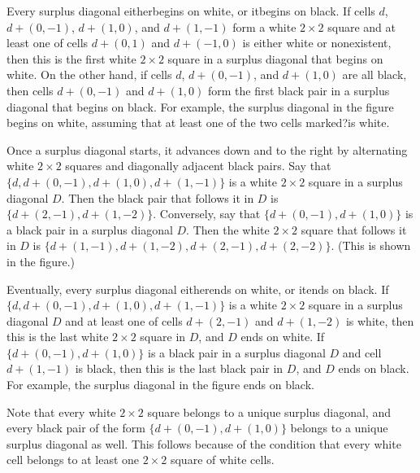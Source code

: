 \documentclass{article}
\begin{document}
Every surplus diagonal eitherbegins on white, or itbegins on black. If cells \(\displaystyle d\), \(\displaystyle d + (0, -1)\), \(\displaystyle d + (1, 0)\), and \(\displaystyle d + (1, -1)\) form a white \(\displaystyle 2 \times 2\) square and at least one of cells \(\displaystyle d + (0, 1)\) and \(\displaystyle d + (-1, 0)\) is either white or nonexistent, then this is the first white \(\displaystyle 2 \times 2\) square in a surplus diagonal that begins on white. On the other hand, if cells \(\displaystyle d\), \(\displaystyle d + (0, -1)\), and \(\displaystyle d + (1, 0)\) are all black, then cells \(\displaystyle d + (0, -1)\) and \(\displaystyle d + (1, 0)\) form the first black pair in a surplus diagonal that begins on black. For example, the surplus diagonal in the figure begins on white, assuming that at least one of the two cells marked?is white.

Once a surplus diagonal starts, it advances down and to the right by alternating white \(\displaystyle 2 \times 2\) squares and diagonally adjacent black pairs. Say that \(\displaystyle \{d, d + (0, -1), d + (1, 0), d + (1, -1)\}\) is a white \(\displaystyle 2 \times 2\) square in a surplus diagonal \(\displaystyle D\). Then the black pair that follows it in \(\displaystyle D\) is \(\displaystyle \{d + (2, -1), d + (1, -2)\}\). Conversely, say that \(\displaystyle \{d + (0, -1), d + (1, 0)\}\) is a black pair in a surplus diagonal \(\displaystyle D\). Then the white \(\displaystyle 2 \times 2\) square that follows it in \(\displaystyle D\) is \(\displaystyle \{d + (1, -1), d + (1, -2), d + (2, -1), d + (2, -2)\}\). (This is shown in the figure.)

Eventually, every surplus diagonal eitherends on white, or itends on black. If \(\displaystyle \{d, d + (0, -1), d + (1, 0), d + (1, -1)\}\) is a white \(\displaystyle 2 \times 2\) square in a surplus diagonal \(\displaystyle D\) and at least one of cells \(\displaystyle d + (2, -1)\) and \(\displaystyle d + (1, -2)\) is white, then this is the last white \(\displaystyle 2 \times 2\) square in \(\displaystyle D\), and \(\displaystyle D\) ends on white. If \(\displaystyle \{d + (0, -1), d + (1, 0)\}\) is a black pair in a surplus diagonal \(\displaystyle D\) and cell \(\displaystyle d + (1, -1)\) is black, then this is the last black pair in \(\displaystyle D\), and \(\displaystyle D\) ends on black. For example, the surplus diagonal in the figure ends on black.

Note that every white \(\displaystyle 2 \times 2\) square belongs to a unique surplus diagonal, and every black pair of the form \(\displaystyle \{d + (0, -1), d + (1, 0)\}\) belongs to a unique surplus diagonal as well. This follows because of the condition that every white cell belongs to at least one \(\displaystyle 2 \times 2\) square of white cells.
\end{document}
